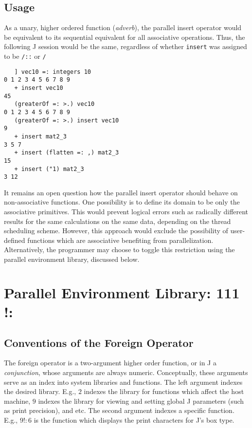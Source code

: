 \subsection{Usage}
As a unary, higher ordered function (\textit{adverb}), 
the parallel insert operator would be equivalent to its sequential equivalent 
for all associative operations. 
Thus, the following J session would be the same, 
regardless of whether \texttt{insert}
was assigned to be \texttt{/::} or \texttt{/}

\begin{singlespacing}
\begin{small}
\begin{verbatim}
   ] vec10 =: integers 10
0 1 2 3 4 5 6 7 8 9
   + insert vec10
45
   (greaterOf =: >.) vec10
0 1 2 3 4 5 6 7 8 9
   (greaterOf =: >.) insert vec10
9
   + insert mat2_3
3 5 7
   + insert (flatten =: ,) mat2_3
15
   + insert ("1) mat2_3
3 12
\end{verbatim}
\end{small}
\end{singlespacing}

It remains an open question how the parallel insert operator should behave on non-associative functions.
One possibility is to define its domain to be only the associative primitives. 
This would prevent logical errors such as radically different results for the same calculations on the same data, 
depending on the thread scheduling scheme. 
However, this approach would exclude the possibility of 
user-defined functions which are associative benefiting from parallelization.
Alternatively, the programmer may choose to toggle this restriction using the parallel environment library, 
discussed below.

\section{Parallel Environment Library: 111 !:} 
\label{pfor}

\subsection{Conventions of the Foreign Operator}
The foreign operator is a two-argument higher order function, or in J a \textit{conjunction}, 
whose arguments are always numeric.
Conceptually, these arguments serve as an index into system libraries and functions.
The left argument indexes the desired library.
E.g., $2$ indexes the library for functions which affect the host machine, 
$9$ indexes the library for viewing and setting global J parameters (such as print precision), and etc.
The second argument indexes a specific function.
E.g., $9!:6$ is the function which displays the print characters for J's box type.

